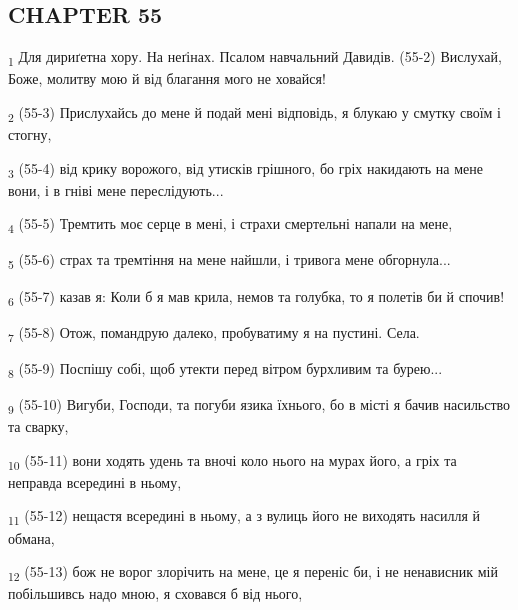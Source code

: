 \subsection{CHAPTER 55}
\begin{tcolorbox}
\textsubscript{1} Для дириґетна хору. На неґінах. Псалом навчальний Давидів. (55-2) Вислухай, Боже, молитву мою й від благання мого не ховайся!
\end{tcolorbox}
\begin{tcolorbox}
\textsubscript{2} (55-3) Прислухайсь до мене й подай мені відповідь, я блукаю у смутку своїм і стогну,
\end{tcolorbox}
\begin{tcolorbox}
\textsubscript{3} (55-4) від крику ворожого, від утисків грішного, бо гріх накидають на мене вони, і в гніві мене переслідують...
\end{tcolorbox}
\begin{tcolorbox}
\textsubscript{4} (55-5) Тремтить моє серце в мені, і страхи смертельні напали на мене,
\end{tcolorbox}
\begin{tcolorbox}
\textsubscript{5} (55-6) страх та тремтіння на мене найшли, і тривога мене обгорнула...
\end{tcolorbox}
\begin{tcolorbox}
\textsubscript{6} (55-7) казав я: Коли б я мав крила, немов та голубка, то я полетів би й спочив!
\end{tcolorbox}
\begin{tcolorbox}
\textsubscript{7} (55-8) Отож, помандрую далеко, пробуватиму я на пустині. Села.
\end{tcolorbox}
\begin{tcolorbox}
\textsubscript{8} (55-9) Поспішу собі, щоб утекти перед вітром бурхливим та бурею...
\end{tcolorbox}
\begin{tcolorbox}
\textsubscript{9} (55-10) Вигуби, Господи, та погуби язика їхнього, бо в місті я бачив насильство та сварку,
\end{tcolorbox}
\begin{tcolorbox}
\textsubscript{10} (55-11) вони ходять удень та вночі коло нього на мурах його, а гріх та неправда всередині в ньому,
\end{tcolorbox}
\begin{tcolorbox}
\textsubscript{11} (55-12) нещастя всередині в ньому, а з вулиць його не виходять насилля й обмана,
\end{tcolorbox}
\begin{tcolorbox}
\textsubscript{12} (55-13) бож не ворог злорічить на мене, це я переніс би, і не ненависник мій побільшивсь надо мною, я сховався б від нього,
\end{tcolorbox}
